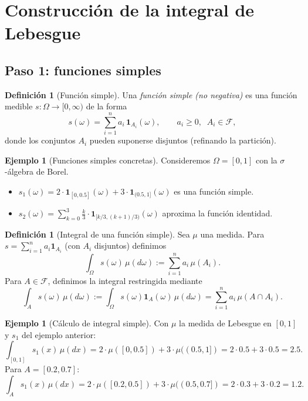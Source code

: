 \documentclass[11pt,a4paper]{article}
\theoremstyle{plain}
\theoremstyle{definition}
\newtheorem{definition}[theorem]{Definición}
\newtheorem{example}[theorem]{Ejemplo}
\theoremstyle{remark}
\newcommand{\1}{\mathbf{1}}
\newcommand{\cF}{\mathcal{F}}
\begin{document}
\section{Construcción de la integral de Lebesgue}

\subsection{Paso 1: funciones simples}

\begin{definition}[Función simple]
Una \emph{función simple (no negativa)} es una función medible $s:\Omega\to[0,\infty)$ de la forma
\[
s(\omega)=\sum_{i=1}^n a_i\,\1_{A_i}(\omega),
\qquad a_i\ge 0,\;\; A_i\in\cF,
\]
donde los conjuntos $A_i$ pueden suponerse disjuntos (refinando la partición).
\end{definition}

\begin{example}[Funciones simples concretas]
Consideremos $\Omega=[0,1]$ con la $\sigma$-álgebra de Borel.
\begin{itemize}
\item $s_1(\omega)=2\cdot\1_{[0,0.5]}(\omega)+3\cdot\1_{(0.5,1]}(\omega)$ es una función simple.
\item $s_2(\omega)=\sum_{k=0}^{3} \frac{k}{3}\cdot\1_{[k/3,(k+1)/3)}(\omega)$ aproxima la función identidad.
\end{itemize}
\end{example}

\begin{definition}[Integral de una función simple]
Sea $\mu$ una medida. Para $s=\sum_{i=1}^n a_i\1_{A_i}$ (con $A_i$ disjuntos) definimos
\[
\int_\Omega s(\omega)\,\mu(d\omega) := \sum_{i=1}^n a_i\,\mu(A_i).
\]
Para $A\in\cF$, definimos la integral restringida mediante
\[
\int_A s(\omega)\,\mu(d\omega) := \int_\Omega s(\omega)\1_A(\omega)\,\mu(d\omega)
= \sum_{i=1}^n a_i\,\mu(A\cap A_i).
\]
\end{definition}

\begin{example}[Cálculo de integral simple]
Con $\mu$ la medida de Lebesgue en $[0,1]$ y $s_1$ del ejemplo anterior:
\[
\int_{[0,1]} s_1(x)\,\mu(dx) = 2\cdot\mu([0,0.5]) + 3\cdot\mu((0.5,1]) = 2\cdot0.5 + 3\cdot0.5 = 2.5.
\]
Para $A=[0.2,0.7]$:
\[
\int_A s_1(x)\,\mu(dx) = 2\cdot\mu([0.2,0.5]) + 3\cdot\mu((0.5,0.7]) = 2\cdot0.3 + 3\cdot0.2 = 1.2.
\]
\end{example}
\end{document}
